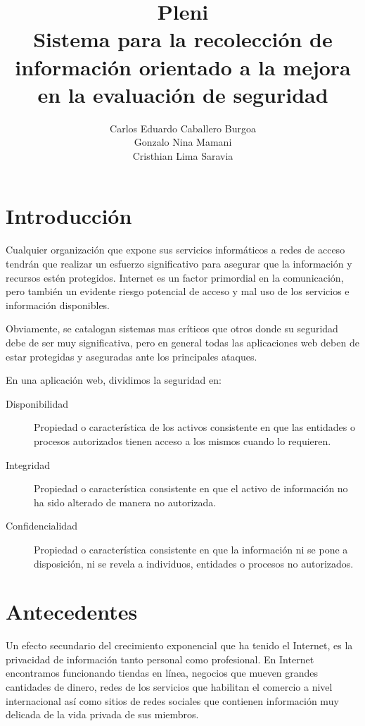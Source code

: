 \documentclass[letter,twoside,11pt]{article}
\title{\bf Pleni \\ Sistema para la recolección de información
orientado a la mejora en la evaluación de seguridad}
\author{
    Carlos Eduardo Caballero Burgoa \\
    Gonzalo Nina Mamani \\
    Cristhian Lima Saravia \\
}
\newcommand{\blankpage}{
\newpage
\thispagestyle{empty}
\mbox{}
\newpage
}
\begin{document}
\maketitle

\blankpage
\tableofcontents
\blankpage

\section{Introducción}
Cualquier organización que expone sus servicios informáticos a redes de acceso
tendrán que realizar un esfuerzo significativo para asegurar que la información
y recursos estén protegidos. Internet es un factor primordial en la
comunicación, pero también un evidente riesgo potencial de acceso y mal uso de
los servicios e información disponibles.

Obviamente, se catalogan sistemas mas críticos que otros donde su seguridad debe
de ser muy significativa, pero en general todas las aplicaciones web deben de
estar protegidas y aseguradas ante los principales ataques.

En una aplicación web, dividimos la seguridad en:

\begin{description}
    \item [Disponibilidad] Propiedad o característica de los activos consistente
        en que las entidades o procesos autorizados tienen acceso a los mismos
        cuando lo requieren.
    \item [Integridad] Propiedad o característica consistente en que el activo
        de información no ha sido alterado de manera no autorizada.
    \item [Confidencialidad] Propiedad o característica consistente en que la
        información ni se pone a disposición, ni se revela a individuos,
        entidades o procesos no autorizados.
\end{description}

\section{Antecedentes}
Un efecto secundario del crecimiento exponencial que ha tenido el Internet, es
la privacidad de información tanto personal como profesional. En Internet
encontramos funcionando tiendas en línea, negocios que mueven grandes
cantidades de dinero, redes de los servicios que habilitan el comercio a nivel
internacional así como sitios de redes sociales que contienen información muy
delicada de la vida privada de sus miembros.
\end{document}
